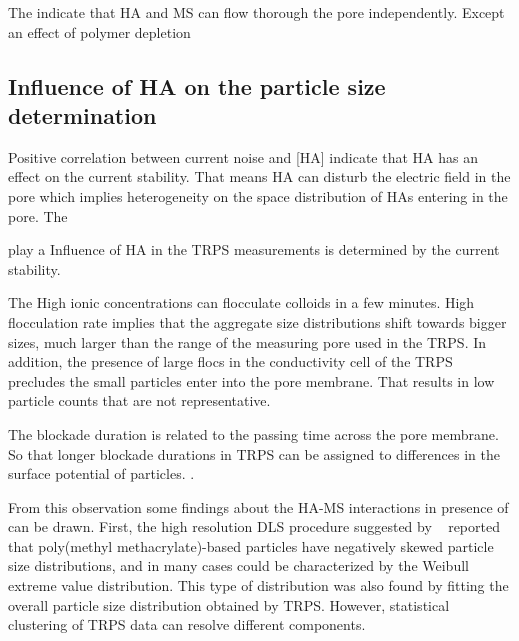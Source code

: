 \documentclass[journal=langd5,manuscript=article]{achemso}
\begin{document}
The indicate that HA and MS can flow thorough the pore independently. Except an effect of polymer depletion 

\subsection{Influence of HA on the particle size determination}


Positive correlation between current noise and [HA] indicate that HA has an effect on the current stability. That means HA can disturb the electric field in the pore   which implies heterogeneity on the space distribution of HAs entering in the pore. 
The 


play a
Influence of HA in the TRPS measurements is determined by the current stability.

The High ionic concentrations can flocculate colloids in a few minutes. High flocculation rate implies that the aggregate size distributions shift towards bigger sizes, much larger than the range of the measuring pore used in the TRPS. In addition, the presence of large flocs in the conductivity cell of the TRPS precludes the small particles enter into the pore membrane. That results in low particle counts that are not representative.


The blockade duration is related to the passing time across the pore membrane. So that longer blockade durations in TRPS can be assigned to differences in the surface potential of particles.
\citeauthor{Weatherall2016}
\citeyear{Weatherall2016}.

From this observation  some findings about the HA-MS interactions in presence of  can be drawn.
 First, the  high resolution DLS procedure suggested by
 ~\citeauthor{Bryant2003AccurateSuspensions}\cite{Bryant2003AccurateSuspensions} 
reported  that poly(methyl methacrylate)-based particles have negatively
skewed particle size distributions, and in many cases could be characterized
by the Weibull extreme value distribution. This type of distribution 
was also found by fitting the overall particle size distribution obtained by TRPS. However, statistical clustering of TRPS data can resolve different components.
\end{document}

